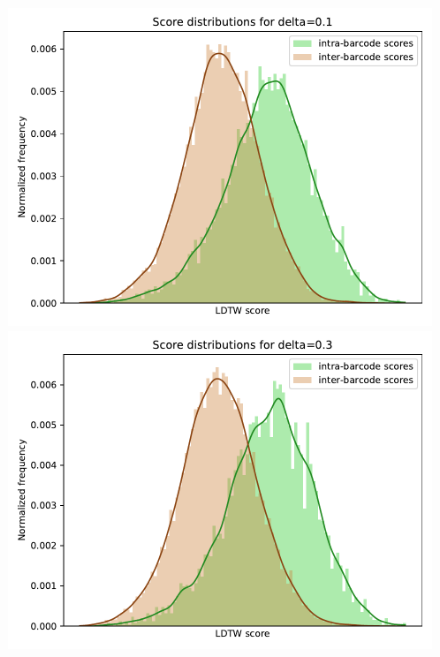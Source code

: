 \begin{figure}[!ht] %
\includegraphics[scale=0.5]{images/delta/delta_raw_10.pdf}
\includegraphics[scale=0.5]{images/delta/delta_raw_30.pdf}


\end{figure}
